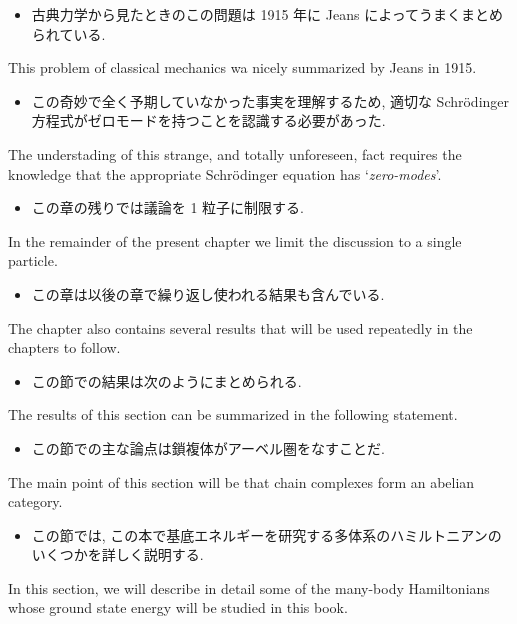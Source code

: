 \documentclass[openany, a4paper, oneside]{jsbook}
\begin{document}
\begin{itemize}
\item 古典力学から見たときのこの問題は 1915 年に Jeans によってうまくまとめられている. \cite{LiebSeiringer1}
\end{itemize}
This problem of classical mechanics wa nicely summarized by Jeans in 1915.

\begin{itemize}
\item この奇妙で全く予期していなかった事実を理解するため, 適切な Schr\"odinger 方程式がゼロモードを持つことを認識する必要があった.
\end{itemize}
The understading of this strange, and totally unforeseen, fact requires the knowledge that the
appropriate Schr\"odinger equation has `\textit{zero-modes}'.

\begin{itemize}
\item この章の残りでは議論を 1 粒子に制限する. \cite{LiebSeiringer1}
\end{itemize}
In the remainder of the present chapter we limit the discussion to a single particle.

\begin{itemize}
\item この章は以後の章で繰り返し使われる結果も含んでいる. \cite{LiebSeiringer1}
\end{itemize}
The chapter also contains several results that will be used repeatedly in the chapters to follow.

\begin{itemize}
\item この節での結果は次のようにまとめられる. \cite{LiebSeiringer1}
\end{itemize}
The results of this section can be summarized in the following statement.

\begin{itemize}
\item この節での主な論点は鎖複体がアーベル圏をなすことだ. \cite{CharlesWeibel1}
\end{itemize}
The main point of this section will be that chain complexes form an abelian category.

\begin{itemize}
\item この節では, この本で基底エネルギーを研究する多体系のハミルトニアンのいくつかを詳しく説明する.
\end{itemize}
In this section, we will describe in detail some of the many-body Hamiltonians whose
ground state energy will be studied in this book.
\end{document}
